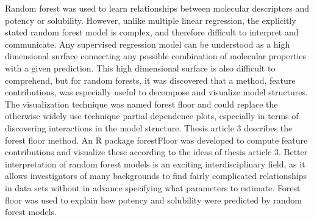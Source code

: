 Random forest was used to learn relationships between molecular descriptors and potency or solubility. However, unlike multiple linear regression, the explicitly stated random forest model is complex, and therefore difficult to interpret and communicate. Any supervised regression model can be understood as a high dimensional surface connecting any possible combination of molecular properties with a given prediction. This high dimensional surface is also difficult to comprehend, but for random forests, it was discovered that a method, feature contributions, was especially useful to decompose and visualize model structures. The visualization technique was named forest floor and could replace the otherwise widely use technique partial dependence plots, especially in terms of discovering interactions in the model structure. Thesis article 3 describes the forest floor method. An R package forestFloor was developed to compute feature contributions and visualize these according to the ideas of thesis article 3. Better interpretation of random forest models is an exciting interdisciplinary field, as it allows investigators of many backgrounds to find fairly complicated relationships in data sets without in advance specifying what parameters to estimate. Forest floor was used to explain how potency and solubility were predicted by random forest models.